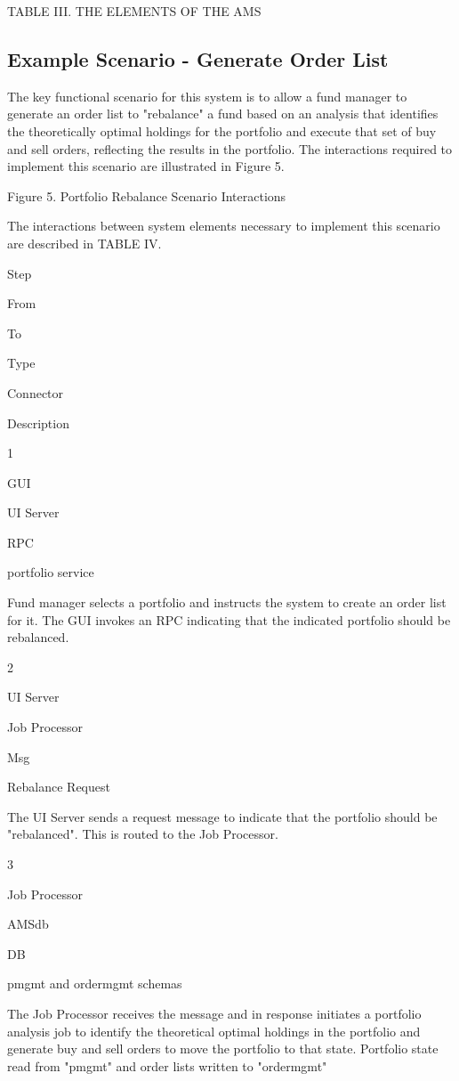 \begin{itemise}
TABLE III.  THE ELEMENTS OF THE AMS

\subsection{Example Scenario - Generate Order List}

  The key functional scenario for this system is to allow a fund manager to generate an order list to "rebalance" a fund based on an analysis that identifies the theoretically optimal holdings for the portfolio and execute that set of buy and sell orders, reflecting the results in the portfolio.  The interactions required to implement this scenario are illustrated in Figure 5. 

  

  

Figure 5.  Portfolio Rebalance Scenario Interactions

  The interactions between system elements necessary to implement this scenario are described in TABLE IV. 

Step

From

To

Type

Connector

Description

1

GUI

UI Server

RPC

portfolio service

Fund manager selects a portfolio and instructs the system to create an order list for it.  The GUI invokes an RPC indicating that the indicated portfolio should be rebalanced.

2

UI Server

Job Processor

Msg

Rebalance Request

The UI Server sends a request message to indicate that the portfolio should be "rebalanced".  This is routed to the Job Processor. 

3

Job Processor

AMSdb

DB

pmgmt and ordermgmt schemas

The Job Processor receives the message and in response initiates a portfolio analysis job to identify the theoretical optimal holdings in the portfolio and generate buy and sell orders to move the portfolio to that state.  Portfolio state read from "pmgmt" and order lists written to "ordermgmt"


\end{itemise}
